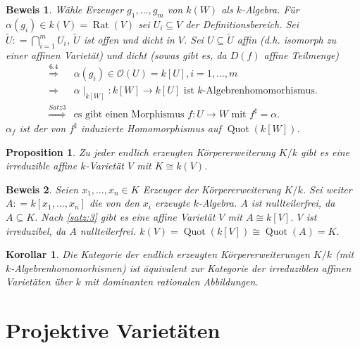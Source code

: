 \documentclass[a4paper,12pt]{report}
\theoremstyle{break}
\newtheorem{Prop}[Def]{Proposition}
\newtheorem{Kor}[Def]{Korollar}
\theoremstyle{nonumberbreak}
\theoremstyle{nonumberplain}
\newtheorem{Bew}{Beweis}
\newcommand{\defeqr}[0]{\mathrel{\mathop:}=}
\DeclareMathOperator{\Quot}{Quot}
\DeclareMathOperator{\Rat}{Rat}
\begin{document}
\begin{Bew}
  Wähle Erzeuger $g_1,\dots,g_m$ von $k(W)$ als $k$-Algebra. Für $\alpha(g_i)\in k(V)=\Rat(V)$ sei
  $U_i\subseteq V$ der Definitionsbereich. Sei $\tilde{U}\defeqr\bigcap_{i=1}^m U_i$, $\tilde{U}$ ist offen und dicht in $V$.
Sei $U\subseteq\tilde{U}$ affin (d.h. isomorph zu einer affinen Varietät) und dicht (sowas gibt es, da $D(f)$ affine Teilmenge)
\begin{align*}
\stackrel{6.4}{\Rightarrow}&\alpha(g_i)\in\mathcal O(U)=k[U], i=1,\dots,m \\
  \Rightarrow&\alpha\mid_{k[W]}:k[W]\longrightarrow k[U] \text{ ist $k$-Algebrenhomomorhismus.} \\
\stackrel{Satz 3}{\Rightarrow}&\text{es gibt einen Morphismus $f:U\longrightarrow W$ mit $f^\sharp=\alpha$.}
\end{align*}
$\alpha_f$ ist der von $f^\sharp$ induzierte Homomorphismus auf $\Quot(k[W])$.
\end{Bew}
\begin{Prop}
  \label{prop:7.4}
Zu jeder endlich erzeugten Körpererweiterung $K/k$ gibt es eine irreduzible affine $k$-Varietät $V$ mit $K\cong k(V)$.
\end{Prop}
\begin{Bew}
  Seien $x_1,\dots,x_n\in K$ Erzeuger der Körpererweiterung $K/k$. Sei weiter $A\defeqr k[x_1,\dots,x_n]$ die von
den $x_i$ erzeugte $k$-Algebra. $A$ ist nullteilerfrei, da $A\subseteq K$. Nach \ref{satz:3} gibt es eine 
affine Varietät $V$ mit $A\cong k[V]$. $V$ ist irreduzibel, da $A$ nullteilerfrei. $k(V)=\Quot(k[V])\cong\Quot(A)=K$.
\end{Bew}
\begin{Kor}
  \label{kor:7.5}
Die Kategorie der endlich erzeugten Körpererweiterungen $K/k$ (mit $k$-Algebrenhomomorhismen)
ist äquivalent zur Kategorie der irreduziblen affinen Varietäten über $k$ mit dominanten rationalen Abbildungen.
\end{Kor}



\chapter{Projektive Varietäten}
\setcounter{section}{7}
\end{document}
